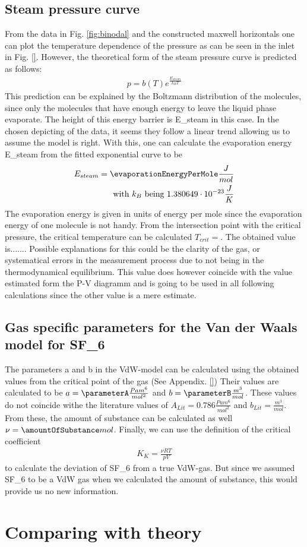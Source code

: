 \documentclass[a4paper,10pt,twocolumn]{article}
\begin{document}
    \subsection{Steam pressure curve}\label{subsec:steamPressureCurve}
    From the data in Fig. \ref{fig:binodal} and the constructed maxwell horizontals one can plot the temperature dependence of the pressure as can be seen in the inlet in Fig. \ref{}.
    However, the theoretical form of the steam pressure curve is predicted as follows:
    \begin{align}
        p=b(T)e^\frac{E_{steam}}{k_B T}
    \end{align}
    This prediction can be explained by the Boltzmann distribution of the molecules, since only the molecules that have enough energy to leave the liquid phase evaporate.
    The height of this energy barrier is E_{steam}\) in this case.
    In the chosen depicting of the data, it seems they follow a linear trend allowing us to assume the model is right.
    With this, one can calculate the evaporation energy E_{steam}\) from the fitted exponential curve to be
    \begin{align}
        E_{steam} = \evaporationEnergyPerMole \frac{J}{mol}
        \endline \text{with } k_B \text{ being } 1.380649\cdot 10^{-23}\frac{J}{K}
    \end{align}
    The evaporation energy is given in units of energy per mole since the evaporation energy of one molecule is not handy. 
    From the intersection point with the critical pressure, the critical temperature can be calculated $T_{crit}=$.
    The obtained value is.......
    Possible explanations for this could be the clarity of the gas, or systematical errors in the measurement process due to not being in the thermodynamical equilibrium.
    This value does however coincide with the value estimated form the P-V diagramm and is going to be used in all following calculations since the other value is a mere estimate.
    
    \subsection{Gas specific parameters for the Van der Waals model for SF_6\)}\label{subsec:gasSpecParams}
    The parameters a and b in the VdW-model can be calculated using the obtained values from the critical point of the gas (See Appendix. \ref{})
    Their values are calculated to be $a = \parameterA \frac{Pa m^6}{mol^2}$ and $b =\parameterB \frac{m^3}{mol}$.
    These values do not coincide withe the literature values of $A_{Lit} = 0.786 \frac{Pa m^6}{mol^2}$ and $b_{Lit} = \frac{m^3}{mol}$.
    From these, the amount of substance can be calculated as well $\nu = \amountOfSubstance mol$.
    Finally, we can use the definition of the critical coefficient
    \begin{align}\label{eq:critcalCoeff}
        K_K = \frac{\nu RT}{pV}
    \end{align}
    to calculate the deviation of SF_6\) from a true VdW-gas.
    But since we assumed SF_6\) to be a VdW gas when we calculated the amount of substance, this would provide us no new information.
    
    \section{Comparing with theory}\label{sec:comaringTheory}
    
\end{document}
